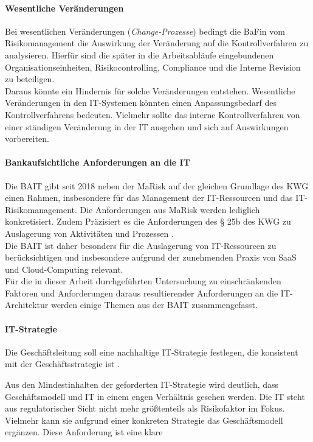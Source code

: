 \paragraph{Wesentliche Veränderungen}
Bei wesentlichen Veränderungen (\emph{Change-Prozesse}) bedingt die \ac{BaFin} \cite{MaRisk:2017} vom Risikomanagement die Auswirkung der Veränderung auf die Kontrollverfahren zu analysieren. Hierfür sind die später in die Arbeitsabläufe eingebundenen Organisationseinheiten, Risikocontrolling, Compliance und die Interne Revision zu beteiligen. 
\medskip
\\
Daraus könnte ein Hindernis für solche Veränderungen entstehen. Wesentliche Veränderungen in den IT-Systemen könnten einen Anpassungsbedarf des Kontrollverfahrens bedeuten. Vielmehr sollte das interne Kontrollverfahren von einer ständigen Veränderung in der IT ausgehen und sich auf Auswirkungen vorbereiten.

\paragraph{Bankaufsichtliche Anforderungen an die IT}
Die \ac{BAIT} gibt seit 2018 neben der \ac{MaRisk} auf der gleichen Grundlage des \ac{KWG} einen  Rahmen, insbesondere für das Management der IT-Ressourcen und das IT-Risikomanagement. Die Anforderungen aus \ac{MaRisk} werden lediglich konkretisiert. Zudem Präzisiert es die Anforderungen des § 25b des
\ac{KWG} zu Auslagerung von Aktivitäten und Prozessen \cite{BAIT:2018}.
\\
Die \ac{BAIT} ist daher besonders für die Auslagerung von IT-Ressourcen zu berücksichtigen und insbesondere aufgrund der zunehmenden Praxis von \ac{SaaS} und Cloud-Computing relevant.
\\
Für die in dieser Arbeit durchgeführten Untersuchung zu einschränkenden Faktoren und Anforderungen daraus resultierender Anforderungen an die IT-Architektur werden einige Themen aus der \ac{BAIT} zusammengefasst.


\paragraph{IT-Strategie} Die Geschäftsleitung soll eine nachhaltige IT-Strategie festlegen, die konsistent mit der Geschäftsstrategie ist \cite{BAIT:2018}. 

Aus den Mindestinhalten der geforderten IT-Strategie wird deutlich, dass Geschäftsmodell und IT in einem engen Verhältnis gesehen werden. Die IT steht aus regulatorischer Sicht nicht mehr größtenteils als Risikofaktor im Fokus. Vielmehr kann sie aufgrund einer konkreten Strategie das Geschäftsmodell ergänzen. Diese Anforderung ist eine klare 

